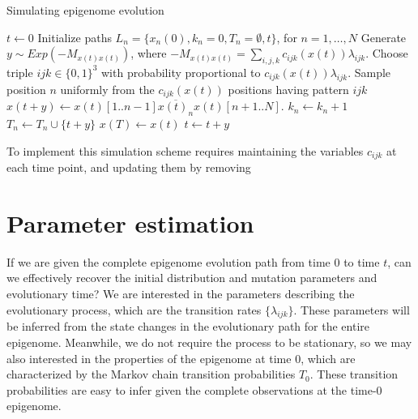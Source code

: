\documentclass[11pt]{article}
\begin{document}
\begin{algorithm}[t]
  \begin{algorithmic}[1]
    \caption{Simulating epigenome evolution}
    \STATE $t \leftarrow 0$
    \STATE Initialize paths $L_n = \{x_n(0), k_n=0, T_n=\emptyset, t\}$, for $n=1,\ldots, N$
    \STATE Generate $y\sim \mathit{Exp}(-M_{x(t)x(t)})$, where
    $-M_{x(t)x(t)} = \sum_{i,j,k}c_{ijk}(x(t))\lambda_{ijk}$.
    \STATE Choose triple $ijk \in \{0,1\}^3$ with probability proportional to $c_{ijk}(x(t))\lambda_{ijk}$.
    \STATE Sample position $n$ uniformly from the $c_{ijk}(x(t))$ positions having pattern $ijk$
    \STATE $x(t+y) \leftarrow x(t)[1..n-1]\overline{x(t)_n}x(t)[n+1..N]$.
    \STATE $k_n \leftarrow k_n + 1$ %
    \STATE $T_n \leftarrow T_n\cup \{t+y\}$
    \ELSE
    \STATE $x(T) \leftarrow x(t)$
    \ENDIF
    \STATE $t \leftarrow t+y$
    \ENDWHILE
  \end{algorithmic}
\end{algorithm}

To implement this simulation scheme requires maintaining the variables
$c_{ijk}$ at each time point, and updating them by removing



\section{Parameter estimation}

If we are given the complete epigenome evolution path from time $0$ to
time $t$, can we effectively recover the initial distribution and
mutation parameters and evolutionary time? We are interested in the
parameters describing the evolutionary process, which are the
transition rates $\{\lambda_{ijk}\}$. These parameters will be
inferred from the state changes in the evolutionary path for the
entire epigenome. Meanwhile, we do not require the process to be
stationary, so we may also interested in the properties of the
epigenome at time 0, which are characterized by the Markov chain
transition probabilities $T_{0}$. These transition probabilities are
easy to infer given the complete observations at the time-0 epigenome.
\end{document}
